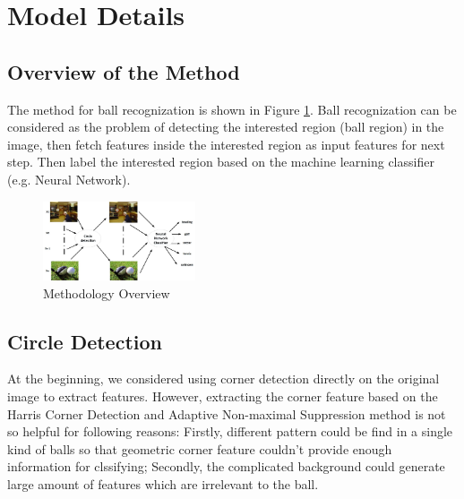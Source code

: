 \documentclass{article}
\begin{document}
\section{Model Details} 


\subsection{Overview of the Method}
The method for ball recognization is shown in Figure \ref{fig:overview}. Ball recognization can be considered as the problem of detecting the interested region (ball region) in the image, then fetch features inside the interested region as input features for next step. Then label the interested region based on the machine learning classifier (e.g. Neural Network).
\begin{figure}[htp]
\centering
\includegraphics[width=0.4\textwidth]{overview.jpg}
\caption{Methodology Overview}
\label{fig:overview}
\end{figure}

\subsection{Circle Detection}
At the beginning, we considered using corner detection directly on the original image to extract features. However, extracting the corner feature based on the Harris Corner Detection and Adaptive Non-maximal Suppression method\cite{brown2005multi} is not so helpful for following reasons: Firstly, different pattern could be find in a single kind of balls so that geometric corner feature couldn't provide enough information for clssifying; Secondly, the complicated background could generate large amount of features which are irrelevant to the ball. 
\end{document}
